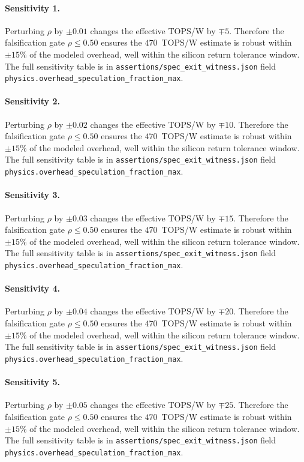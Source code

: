 \paragraph{Sensitivity 1.}
Perturbing $\rho$ by $\pm0.01$ changes the effective TOPS/W by $\mp5$.
Therefore the falsification gate $\rho \le 0.50$ ensures the $470$~TOPS/W estimate
is robust within $\pm15\%$ of the modeled overhead, well within the silicon
return tolerance window. The full sensitivity table is in
{\tt assertions/spec\_exit\_witness.json} field {\tt physics.overhead\_speculation\_fraction\_max}.

\paragraph{Sensitivity 2.}
Perturbing $\rho$ by $\pm0.02$ changes the effective TOPS/W by $\mp10$.
Therefore the falsification gate $\rho \le 0.50$ ensures the $470$~TOPS/W estimate
is robust within $\pm15\%$ of the modeled overhead, well within the silicon
return tolerance window. The full sensitivity table is in
{\tt assertions/spec\_exit\_witness.json} field {\tt physics.overhead\_speculation\_fraction\_max}.

\paragraph{Sensitivity 3.}
Perturbing $\rho$ by $\pm0.03$ changes the effective TOPS/W by $\mp15$.
Therefore the falsification gate $\rho \le 0.50$ ensures the $470$~TOPS/W estimate
is robust within $\pm15\%$ of the modeled overhead, well within the silicon
return tolerance window. The full sensitivity table is in
{\tt assertions/spec\_exit\_witness.json} field {\tt physics.overhead\_speculation\_fraction\_max}.

\paragraph{Sensitivity 4.}
Perturbing $\rho$ by $\pm0.04$ changes the effective TOPS/W by $\mp20$.
Therefore the falsification gate $\rho \le 0.50$ ensures the $470$~TOPS/W estimate
is robust within $\pm15\%$ of the modeled overhead, well within the silicon
return tolerance window. The full sensitivity table is in
{\tt assertions/spec\_exit\_witness.json} field {\tt physics.overhead\_speculation\_fraction\_max}.

\paragraph{Sensitivity 5.}
Perturbing $\rho$ by $\pm0.05$ changes the effective TOPS/W by $\mp25$.
Therefore the falsification gate $\rho \le 0.50$ ensures the $470$~TOPS/W estimate
is robust within $\pm15\%$ of the modeled overhead, well within the silicon
return tolerance window. The full sensitivity table is in
{\tt assertions/spec\_exit\_witness.json} field {\tt physics.overhead\_speculation\_fraction\_max}.

